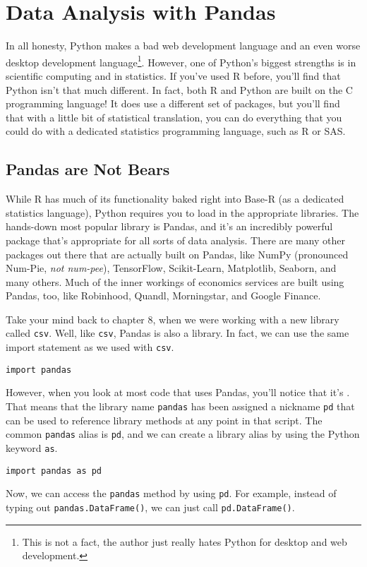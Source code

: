 \chapter{Data Analysis with Pandas}
In all honesty, Python makes a bad web development language and an even worse desktop development language\footnote{This is not a fact, the author just really hates Python for desktop and web development.}. However, one of Python's biggest strengths is in scientific computing and in statistics. If you've used R before, you'll find that Python isn't that much different. In fact, both R and Python are built on the C programming language! It does use a different set of packages, but you'll find that with a little bit of statistical translation, you can do everything that you could do with a dedicated statistics programming language, such as R or SAS.\par

\section{Pandas are Not Bears}
While R has much of its functionality baked right into Base-R (as a dedicated statistics language), Python requires you to load in the appropriate libraries. The hands-down most popular library is Pandas, and it's an incredibly powerful package that's appropriate for all sorts of data analysis. There are many other packages out there that are actually built on Pandas, like NumPy (pronounced Num-Pie, \textit{not num-pee}), TensorFlow, Scikit-Learn, Matplotlib, Seaborn, and many others. Much of the inner workings of economics services are built using Pandas, too, like Robinhood, Quandl, Morningstar, and Google Finance.\par
{}
Take your mind back to chapter 8, when we were working with a new library called \verb|csv|. Well, like \verb|csv|, Pandas is also a library. In fact, we can use the same import statement as we used with \verb|csv|.
\begin{lstlisting}[style=pippython]
import pandas
\end{lstlisting}
However, when you look at most code that uses Pandas, you'll notice that it's . That means that the library name \verb|pandas| has been assigned a nickname \verb|pd| that can be used to reference library methods at any point in that script. The common \verb|pandas| alias is \verb|pd|, and we can create a library alias by using the Python keyword \verb|as|.
\begin{lstlisting}[style=pippython]
import pandas as pd
\end{lstlisting}
Now, we can access the \verb|pandas| method by using \verb|pd|. For example, instead of typing out \verb|pandas.DataFrame()|, we can just call \verb|pd.DataFrame()|.\par
{}
 
